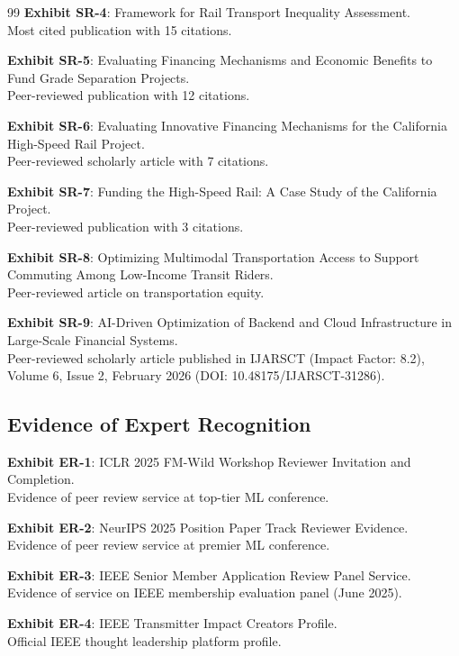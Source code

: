 \documentclass[11pt]{article}
\begin{document}
\begin{thebibliography}{99}
\textbf{Exhibit SR-4}: Framework for Rail Transport Inequality Assessment.\\
Most cited publication with 15 citations.

\textbf{Exhibit SR-5}: Evaluating Financing Mechanisms and Economic Benefits to Fund Grade Separation Projects.\\
Peer-reviewed publication with 12 citations.

\textbf{Exhibit SR-6}: Evaluating Innovative Financing Mechanisms for the California High-Speed Rail Project.\\
Peer-reviewed scholarly article with 7 citations.

\textbf{Exhibit SR-7}: Funding the High-Speed Rail: A Case Study of the California Project.\\
Peer-reviewed publication with 3 citations.

\textbf{Exhibit SR-8}: Optimizing Multimodal Transportation Access to Support Commuting Among Low-Income Transit Riders.\\
Peer-reviewed article on transportation equity.

\textbf{Exhibit SR-9}: AI-Driven Optimization of Backend and Cloud Infrastructure in Large-Scale Financial Systems.\\
Peer-reviewed scholarly article published in IJARSCT (Impact Factor: 8.2), Volume 6, Issue 2, February 2026 (DOI: 10.48175/IJARSCT-31286).

\subsection*{Evidence of Expert Recognition}

\textbf{Exhibit ER-1}: ICLR 2025 FM-Wild Workshop Reviewer Invitation and Completion.\\
Evidence of peer review service at top-tier ML conference.

\textbf{Exhibit ER-2}: NeurIPS 2025 Position Paper Track Reviewer Evidence.\\
Evidence of peer review service at premier ML conference.

\textbf{Exhibit ER-3}: IEEE Senior Member Application Review Panel Service.\\
Evidence of service on IEEE membership evaluation panel (June 2025).

\textbf{Exhibit ER-4}: IEEE Transmitter Impact Creators Profile.\\
Official IEEE thought leadership platform profile.


\end{thebibliography}
\end{document}
